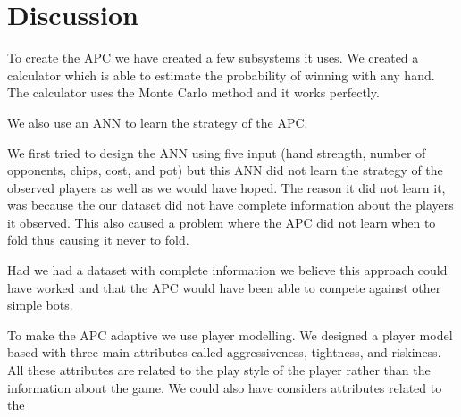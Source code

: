 \section{Discussion}
To create the APC we have created a few subsystems it uses. We created a calculator which is able to estimate the probability of winning with any hand. The calculator uses the Monte Carlo method and it works perfectly.

We also use an ANN to learn the strategy of the APC. 

We first tried to design the ANN using five input (hand strength, number of opponents, chips, cost, and pot) but this ANN did not learn the strategy of the observed players as well as we would have hoped. The reason it did not learn it, was because the our dataset did not have complete information about the players it observed. This also caused a problem where the APC did not learn when to fold thus causing it never to fold.

Had we had a dataset with complete information we believe this approach could have worked and that the APC would have been able to compete against other simple bots. 

To make the APC adaptive we use player modelling. We designed a player model based with three main attributes called aggressiveness, tightness, and riskiness. All these attributes are related to the play style of the player rather than the information about the game.  We could also have considers attributes related to the 

